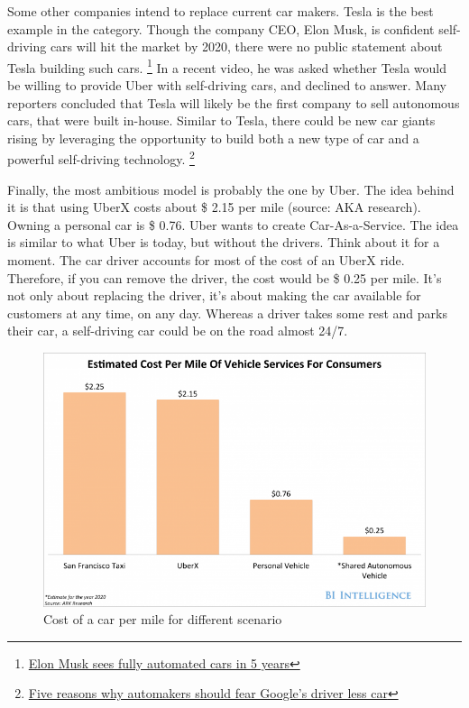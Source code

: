 \documentclass[12pt]{article}
\begin{document}
Some other companies intend to replace current car makers. Tesla is the best
example in the category. Though the company CEO, Elon Musk, is confident
self-driving cars will hit the market by 2020, there were no public statement
about Tesla building such cars. \footnote{\href{http://my.teslamotors.com/fr_CH/forum/forums/tesla\%E2\%80\%99s-musk-sees-fully-autonomous-car-ready-5-years}
{Elon Musk sees fully automated cars in 5 years}} In a recent video, he was asked whether Tesla
would be willing to provide Uber with self-driving cars, and declined to answer.
Many reporters concluded that Tesla will likely be the first company to sell
autonomous cars, that were built in-house. Similar to Tesla, there could be new
car giants rising by leveraging the opportunity to build both a new type of car
and a powerful self-driving technology. \footnote{\href{http://www.forbes.com/sites/chunkamui/2014/08/04/5-reasons-why-automakers-should-fear-googles-driverless-car/}
{Five reasons why automakers should fear Google's driver less car}}

Finally, the most ambitious model is probably the one by Uber. The idea behind
it is that using UberX costs about \$ 2.15 per mile (source: AKA research).
Owning a personal car is \$ 0.76. Uber wants to create Car-As-a-Service.
The idea is similar to what Uber is today, but without the drivers. Think about
it for a moment. The car driver accounts for most of the cost of an UberX ride.
Therefore, if you can remove the driver, the cost would be \$ 0.25 per mile.
It's not only about replacing the driver, it's about making the car available
for customers at any time, on any day. Whereas a driver takes some rest and
parks their car, a self-driving car could be on the road almost 24/7.

\medskip

\begin{figure}[ht]
    \centering
    \includegraphics[width=\linewidth]{vehicle-cost}
    \caption{Cost of a car per mile for different scenario}
    \label{fig:cost_of_car}
\end{figure}
\end{document}
